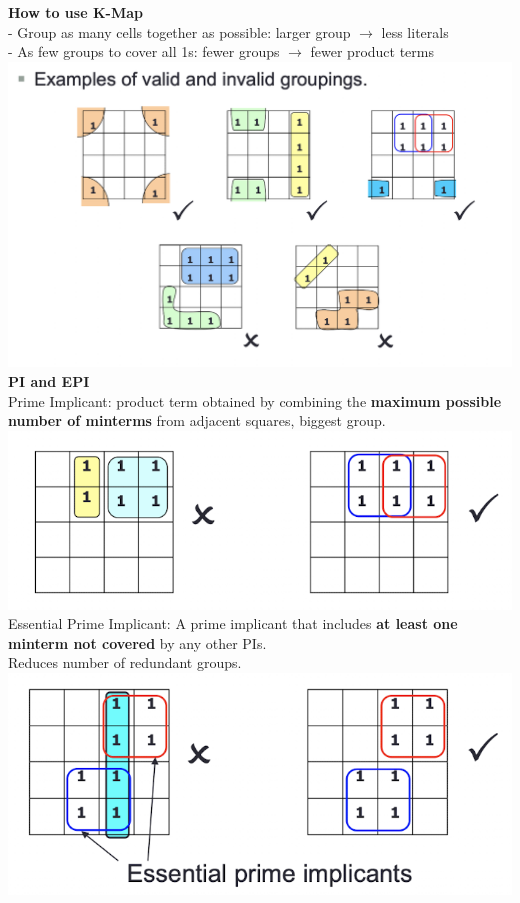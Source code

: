 \documentclass[10pt, a4paper]{article}
\newcommand{\highlight}[1]{{\color{red}\textbf{#1}}}
\begin{document}
\begin{multicols*}{3}
		\textbf{How to use K-Map}\\
		- Group as many cells together as possible: larger group $\rightarrow$ less literals\\
		- As few groups to cover all 1s: fewer groups $\rightarrow$ fewer product terms\\
		\includegraphics[scale=.4]{./assets/validInvalidGroupings}\\
		
		\textbf{PI and EPI}\\
		Prime Implicant: product term obtained by combining the \highlight{maximum possible number of minterms} from adjacent squares, biggest group.\\
		\includegraphics[scale=.5]{./assets/primeImplicant}\\
		
		Essential Prime Implicant: A prime implicant that includes \highlight{at least one minterm not covered} by any other PIs.\\
		Reduces number of redundant groups.\\
		\includegraphics[scale=.5]{./assets/EPI}\\
		

\end{multicols*}
\end{document}
